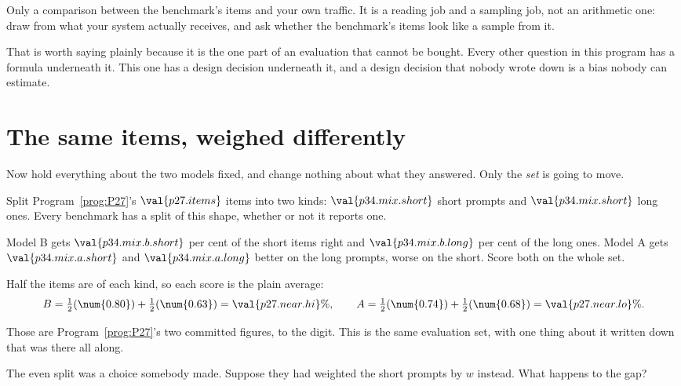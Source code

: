 \begin{fr}
\begin{ansblock}
Only a comparison between the benchmark's items and your own traffic. It is
a reading job and a sampling job, not an arithmetic one: draw from what your
system actually receives, and ask whether the benchmark's items look like a
sample from it.
\end{ansblock}

That is worth saying plainly because it is the one part of an evaluation
that cannot be bought. Every other question in this program has a formula
underneath it. This one has a design decision underneath it, and a design
decision that nobody wrote down is a bias nobody can estimate.

\end{fr}

\section{The same items, weighed differently}
\label{sec:P34-remix}

\begin{fr}
Now hold everything about the two models fixed, and change nothing about
what they answered. Only the \emph{set} is going to move.

Split Program~\ref{prog:P27}'s $\val{p27.items}$ items into two kinds:
$\val{p34.mix.short}$ short prompts and $\val{p34.mix.short}$ long ones. Every
benchmark has a split of this shape, whether or not it reports one.

Model B gets $\val{p34.mix.b.short}$ per cent of the short items right and
$\val{p34.mix.b.long}$ per cent of the long ones. Model A gets
$\val{p34.mix.a.short}$ and $\val{p34.mix.a.long}$ \dash{} better on the long
prompts, worse on the short. Score both on the whole set.
\dotline
\nextframe
\end{fr}

\begin{fr}
\begin{ansblock}
Half the items are of each kind, so each score is the plain average:
\[ B = \tfrac{1}{2}(\num{0.80}) + \tfrac{1}{2}(\num{0.63}) = \val{p27.near.hi}\%,
   \qquad
   A = \tfrac{1}{2}(\num{0.74}) + \tfrac{1}{2}(\num{0.68}) = \val{p27.near.lo}\% . \]
\end{ansblock}

Those are Program~\ref{prog:P27}'s two committed figures, to the digit. This
is the same evaluation set, with one thing about it written down that was
there all along.

The even split was a choice somebody made. Suppose they had weighted the
short prompts by $w$ instead. What happens to the gap?
\dotline
\nextframe
\end{fr}

